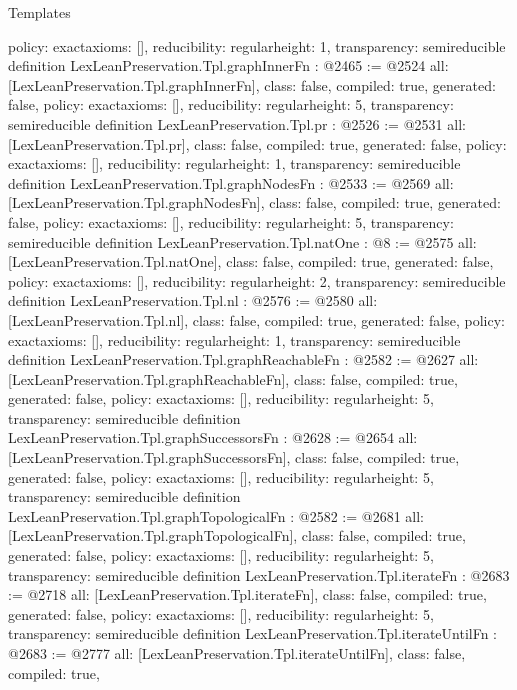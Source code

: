 \begin{lexlean}{Templates}
\begin{coremodule}
{  policy: exact{axioms: []},
  reducibility: regular{height: 1},
  transparency: semireducible
}
definition LexLeanPreservation.Tpl.graphInnerFn : @2465 := @2524 {
  all: [LexLeanPreservation.Tpl.graphInnerFn],
  class: false,
  compiled: true,
  generated: false,
  policy: exact{axioms: []},
  reducibility: regular{height: 5},
  transparency: semireducible
}
definition LexLeanPreservation.Tpl.pr : @2526 := @2531 {
  all: [LexLeanPreservation.Tpl.pr],
  class: false,
  compiled: true,
  generated: false,
  policy: exact{axioms: []},
  reducibility: regular{height: 1},
  transparency: semireducible
}
definition LexLeanPreservation.Tpl.graphNodesFn : @2533 := @2569 {
  all: [LexLeanPreservation.Tpl.graphNodesFn],
  class: false,
  compiled: true,
  generated: false,
  policy: exact{axioms: []},
  reducibility: regular{height: 5},
  transparency: semireducible
}
definition LexLeanPreservation.Tpl.natOne : @8 := @2575 {
  all: [LexLeanPreservation.Tpl.natOne],
  class: false,
  compiled: true,
  generated: false,
  policy: exact{axioms: []},
  reducibility: regular{height: 2},
  transparency: semireducible
}
definition LexLeanPreservation.Tpl.nl : @2576 := @2580 {
  all: [LexLeanPreservation.Tpl.nl],
  class: false,
  compiled: true,
  generated: false,
  policy: exact{axioms: []},
  reducibility: regular{height: 1},
  transparency: semireducible
}
definition LexLeanPreservation.Tpl.graphReachableFn : @2582 := @2627 {
  all: [LexLeanPreservation.Tpl.graphReachableFn],
  class: false,
  compiled: true,
  generated: false,
  policy: exact{axioms: []},
  reducibility: regular{height: 5},
  transparency: semireducible
}
definition LexLeanPreservation.Tpl.graphSuccessorsFn : @2628 := @2654 {
  all: [LexLeanPreservation.Tpl.graphSuccessorsFn],
  class: false,
  compiled: true,
  generated: false,
  policy: exact{axioms: []},
  reducibility: regular{height: 5},
  transparency: semireducible
}
definition LexLeanPreservation.Tpl.graphTopologicalFn : @2582 := @2681 {
  all: [LexLeanPreservation.Tpl.graphTopologicalFn],
  class: false,
  compiled: true,
  generated: false,
  policy: exact{axioms: []},
  reducibility: regular{height: 5},
  transparency: semireducible
}
definition LexLeanPreservation.Tpl.iterateFn : @2683 := @2718 {
  all: [LexLeanPreservation.Tpl.iterateFn],
  class: false,
  compiled: true,
  generated: false,
  policy: exact{axioms: []},
  reducibility: regular{height: 5},
  transparency: semireducible
}
definition LexLeanPreservation.Tpl.iterateUntilFn : @2683 := @2777 {
  all: [LexLeanPreservation.Tpl.iterateUntilFn],
  class: false,
  compiled: true,
}
\end{coremodule}
\end{lexlean}
